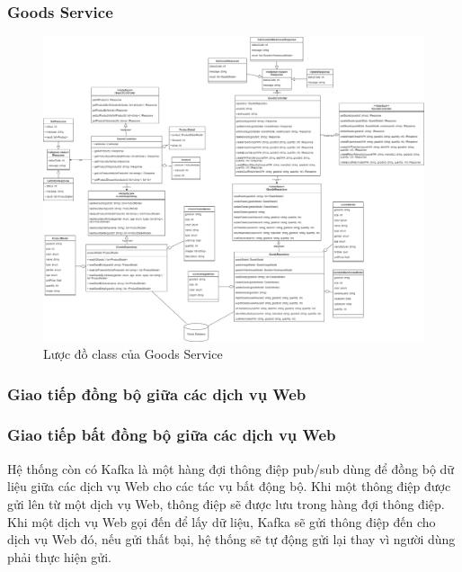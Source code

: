 \subsubsection{Goods Service}
\begin{figure}[!htp]
	\centering
	\includegraphics[width=17cm]{img/Architecture/service/GoodsService.png}
	\newline
	\caption{Lược đồ class của Goods Service}
\end{figure}



\subsubsection{Giao tiếp đồng bộ giữa các dịch vụ Web}



\subsubsection{Giao tiếp bất đồng bộ giữa các dịch vụ Web}

Hệ thống còn có Kafka là một hàng đợi thông điệp pub/sub dùng để đồng bộ dữ liệu giữa các dịch vụ Web cho các tác vụ bất động bộ. Khi một thông điệp được gửi lên từ một dịch vụ Web, thông điệp sẽ được lưu trong hàng đợi thông điệp. Khi một dịch vụ Web gọi đến để lấy dữ liệu, Kafka sẽ gửi thông điệp đến cho dịch vụ Web đó, nếu gửi thất bại, hệ thống sẽ tự động gửi lại thay vì người dùng phải thực hiện gửi.

